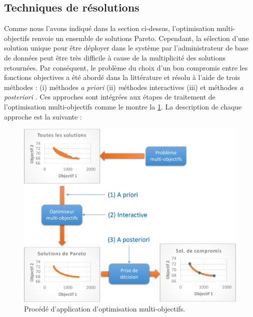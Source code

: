 \subsection{Techniques de résolutions}\label{subsec:ResolutionsTechniques}
Comme nous l'avons indiqué dans la section ci-dessus, l'optimisation multi-objectifs renvoie un ensemble de solutions Pareto. Cependant, la sélection d'une solution unique pour être déployer dans le système par l'administrateur de base de données peut être très difficile à cause de la multiplicité des solutions retournées. Par conséquent, le problème du choix d'un bon compromis entre les fonctions objectives a été abordé dans la littérature et résolu à l'aide de trois méthodes : (i) méthodes \textit{a priori} (ii) \textit méthodes {interactives} (iii) et méthodes \textit{a posteriori} \cite{Hwang79}. Ces approches sont intégrées aux étapes de traitement de l'optimisation multi-objectifs comme le montre la \ref{fig:multiobjective-resolutions}. La description de chaque approche est la suivante :

\begin{figure}
 \centering
 \includegraphics[scale=0.6]{chapitre6/chap6Fig/multiobjective-resolutions}
 \caption{Procédé d'application d'optimisation multi-objectifs.}
 \label{fig:multiobjective-resolutions}
\end{figure}

